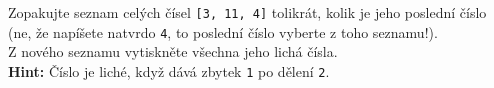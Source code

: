 \question[50]
Zopakujte seznam celých čísel \texttt{[3, 11, 4]} tolikrát, kolik je jeho
poslední číslo (ne,
že napíšete natvrdo \texttt{4}, to poslední číslo vyberte z
toho seznamu!).\\
Z nového seznamu vytiskněte všechna jeho lichá čísla.\\
\textbf{Hint:} Číslo je liché, když dává zbytek \texttt{1} po dělení \texttt{2}.